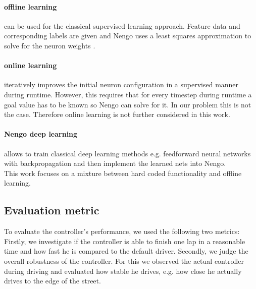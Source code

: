\documentclass[10pt,a4paper,twoside,journal]{IEEEtran}
\begin{document}
\paragraph{offline learning} can be used for the classical supervised learning approach. Feature data and corresponding labels are given and Nengo uses a least squares approximation to solve for the neuron weights \cite{nef}.

\paragraph{online learning} iteratively improves the initial neuron configuration in a supervised manner during runtime. However, this requires that for every timestep during runtime a goal value has to be known so Nengo can solve for it. In our problem this is not the case. Therefore online learning is not further considered in this work.

\paragraph{Nengo deep learning} allows to train classical deep learning methods e.g. feedforward neural networks with backpropagation and then implement the learned nets into Nengo. \\
This work focuses on a mixture between hard coded functionality and offline learning.

\subsection{Evaluation metric}
To evaluate the controller's performance, we used the following two metrics: Firstly, we investigate if the controller is able to finish one lap in a reasonable time and how fast he is compared to the default driver. Secondly, we judge the overall robustness of the controller. For this we observed the actual controller during driving and evaluated how stable he drives, e.g. how close he actually drives to the edge of the street. 
\end{document}
